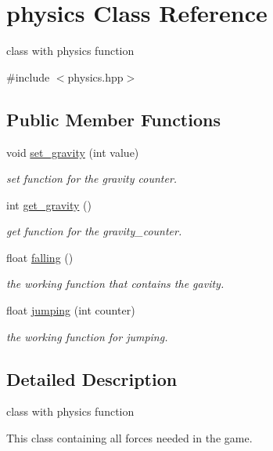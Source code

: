 \hypertarget{classphysics}{}\section{physics Class Reference}
\label{classphysics}


class with physics function  




{\ttfamily \#include $<$physics.\+hpp$>$}

\subsection*{Public Member Functions}
\begin{DoxyCompactItemize}
\item 
void \hyperlink{classphysics_a8b0dff646c304dee3cb5c095d821dc87}{set\+\_\+gravity} (int value)
\begin{DoxyCompactList}\small\item\em set function for the gravity counter. \end{DoxyCompactList}\item 
int \hyperlink{classphysics_a3c4c6084fe0652b0bfd35afa5daa1c1e}{get\+\_\+gravity} ()
\begin{DoxyCompactList}\small\item\em get function for the gravity\+\_\+counter. \end{DoxyCompactList}\item 
float \hyperlink{classphysics_acca1ee2fb8b760b6e4ee61ae7c2ee3da}{falling} ()
\begin{DoxyCompactList}\small\item\em the working function that contains the gavity. \end{DoxyCompactList}\item 
float \hyperlink{classphysics_aaf1c57aa6e35b9c83ccbfdfa8c18468c}{jumping} (int counter)
\begin{DoxyCompactList}\small\item\em the working function for jumping. \end{DoxyCompactList}\end{DoxyCompactItemize}


\subsection{Detailed Description}
class with physics function 

This class containing all forces needed in the game.

